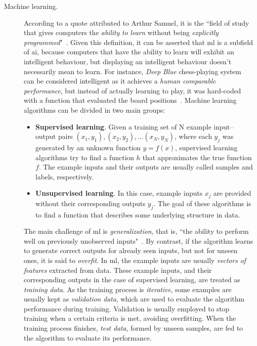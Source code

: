 \begin{description}
	\item[Machine learning.] According to a quote attributed to Arthur Samuel, it is the ``field of study that gives computers the \emph{ability to learn} without being \emph{explicitly programmed}"~\cite{ml-def}. Given this definition, it can be asserted that \gls{ml} is a subfield of \gls{ai}, because computers that have the ability to learn will exhibit an intelligent behaviour, but displaying an intelligent behaviour doesn't necessarily mean to learn. For instance, \emph{Deep Blue} chess-playing system can be considered intelligent as it achieves a \emph{human comparable performance}, but instead of actually learning to play, it was hard-coded with a function that evaluated the board positions~\cite{Goodfellow-et-al-2016}. Machine learning algorithms can be divided in two main groups:
	\begin{itemize}
		\item \textbf{Supervised learning}. Given a training set of N example input–output pairs $(x_1, y_1),(x_2, y_2), . . .(x_N, y_N)$, where each $y_j$ was generated by an unknown function $y = f(x)$, supervised learning algorithms try to find a function $h$ that approximates the true function $f$\cite{Russell:2003:AIM:773294}. The example inputs and their outputs are usually called samples and labels, respectively.
		\item \textbf{Unsupervised learning}. In this case, example inputs $x_j$ are provided without their corresponding outputs $y_j$. The goal of these algorithms is to find a function that describes some underlying structure in data\cite{unsup}. 
	\end{itemize}
	The main challenge of \gls{ml} is \emph{generalization}, that is, ``the ability to perform well on previously unobserved inputs"~\cite{Goodfellow-et-al-2016}. By contrast, if the algorithm learns to generate correct outputs for already seen inputs, but not for unseen ones, it is said to \emph{overfit}. In \gls{ml}, the example inputs are usually \emph{vectors of features} extracted from data. These example inputs, and their corresponding outputs in the case of supervised learning, are treated as \emph{training data}. As the training process is \emph{iterative}, some examples are usually kept as \emph{validation data}, which are used to evaluate the algorithm performance during training. Validation is usually employed to stop training when a certain criteria is met, avoiding overfitting. When the training process finishes, \emph{test data}, formed by unseen samples, are fed to the algorithm to evaluate its performance.
\end{description}
